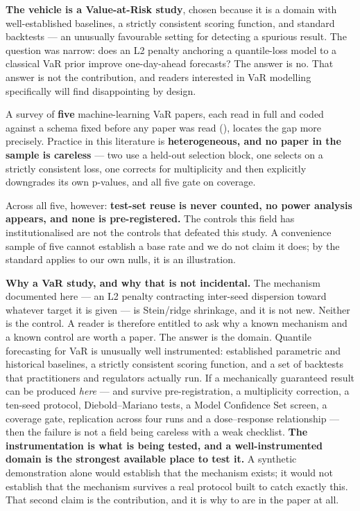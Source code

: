 \textbf{The vehicle is a Value-at-Risk study}, chosen because it is a domain with well-established
baselines, a strictly consistent scoring function, and standard backtests --- an unusually
favourable setting for detecting a spurious result. The question was narrow: does an L2 penalty
anchoring a quantile-loss model to a classical VaR prior improve one-day-ahead forecasts? The
answer is no. That answer is not the contribution, and readers interested in VaR modelling
specifically will find  disappointing by design.

A survey of \textbf{five} machine-learning VaR papers, each read in full and coded against a schema
fixed before any paper was read (), locates the gap more precisely. Practice in this
literature is \textbf{heterogeneous, and no paper in the sample is careless} --- two use a held-out
selection block, one selects on a strictly consistent loss, one corrects for multiplicity and
then explicitly downgrades its own p-values, and all five gate on coverage.

Across all five, however: \textbf{test-set reuse is never counted, no power analysis appears, and none
is pre-registered.} The controls this field has institutionalised are not the controls that
defeated this study. A convenience sample of five cannot establish a base rate and we do not
claim it does; by the standard  applies to our own nulls, it is an illustration.

\textbf{Why a VaR study, and why that is not incidental.} The mechanism documented here --- an L2
penalty contracting inter-seed dispersion toward whatever target it is given --- is Stein/ridge
shrinkage, and it is not new. Neither is the control. A reader is therefore entitled to ask why
a known mechanism and a known control are worth a paper. The answer is the domain. Quantile
forecasting for VaR is unusually well instrumented: established parametric and historical
baselines, a strictly consistent scoring function, and a set of backtests that practitioners and
regulators actually run. If a mechanically guaranteed result can be produced \emph{here} --- and
survive pre-registration, a multiplicity correction, a ten-seed protocol, Diebold--Mariano tests,
a Model Confidence Set screen, a coverage gate, replication across four runs and a dose--response
relationship --- then the failure is not a field being careless with a weak checklist.
\textbf{The instrumentation is what is being tested, and a well-instrumented domain is the strongest
available place to test it.} A synthetic demonstration alone would establish that the mechanism
exists; it would not establish that the mechanism survives a real protocol built to catch
exactly this. That second claim is the contribution, and it is why  to  are in the paper
at all.

